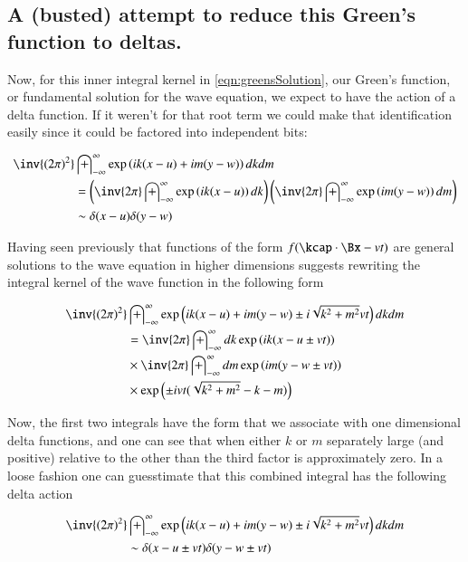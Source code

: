 \documentclass{article}
\newcommand{\IIinf}[0]{ \int_{-\infty}^\infty }
\begin{document}
\subsection{ A (busted) attempt to reduce this Green's function to deltas. }

Now, for this inner integral kernel in \ref{eqn:greensSolution}, our Green's function, or fundamental solution for the wave equation,
we expect to have the action of a delta function.  If it weren't for that root term we could make that
identification easily since it could be factored into independent bits:

\begin{align*}
\inv{({2\pi})^2} &\IIinf \exp\left( i k (x-u) + i m (y-w) \right) dk dm  \\
&=
\left(\inv{{2\pi}} \IIinf \exp\left( i k (x-u) \right) dk \right)
\left(\inv{{2\pi}} \IIinf \exp\left( i m (y-w) \right) dm \right) \\
&\sim \delta( x - u)\delta( y - w)
\end{align*}

Having seen previously that functions of the form $f(\kcap \cdot \Bx -v t)$ are general solutions to the wave equation in higher 
dimensions suggests rewriting the integral kernel of the wave function in the following form

\begin{align*}
\inv{({2\pi})^2} &\IIinf \exp\left( i k (x-u) + i m (y-w) \pm i \sqrt{k^2 + m^2} v t \right) dk dm \\
&=
\inv{{2\pi}} \IIinf dk \exp\left( i k (x - u \pm v t) \right) \\
&\times \inv{{2\pi}} \IIinf dm \exp\left( i m (y - w \pm v t) \right) \\
&\times \exp\left( \pm i v t ( \sqrt{k^2 + m^2} -k - m ) \right) \\
\end{align*}

Now, the first two integrals have the form that we associate with one dimensional delta functions, and one can see that when either 
$k$ or $m$ separately large (and positive) relative to the other than the third factor is approximately zero.  In a loose fashion one
can guesstimate that this combined integral has the following delta action

\begin{align*}
\inv{({2\pi})^2} &\IIinf \exp\left( i k (x-u) + i m (y-w) \pm i \sqrt{k^2 + m^2} v t \right) dk dm \\
&\sim 
\delta( x -u \pm vt )
\delta( y -w \pm vt )
\end{align*}
\end{document}
